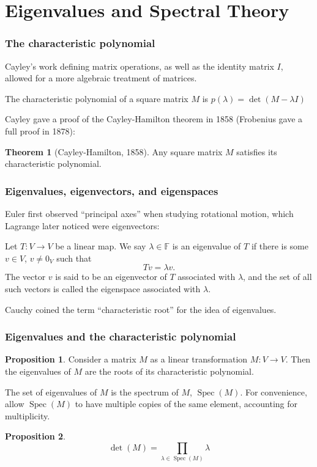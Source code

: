\documentclass{beamer}
\DeclareMathOperator{\Spec}{Spec}
\theoremstyle{definition}
\newtheorem*{theorem*}{Theorem}
\newtheorem*{proposition*}{Proposition}
\begin{document}
\section{Eigenvalues and Spectral Theory}

\begin{frame}
    \frametitle{The characteristic polynomial}

    Cayley's work defining matrix operations, as well as the identity matrix $I$, allowed for a more algebraic treatment of matrices.

    \pause
    \begin{definition}
        The characteristic polynomial of a square matrix $M$ is $p(\lambda) = \det(M - \lambda I)$
    \end{definition}

    \pause
    Cayley gave a proof of the Cayley-Hamilton theorem in 1858 (Frobenius gave a full proof in 1878):
    \begin{theorem*}[Cayley-Hamilton, 1858]
        Any square matrix $M$ satisfies its characteristic polynomial.
    \end{theorem*}
\end{frame}

\begin{frame}
    \frametitle{Eigenvalues, eigenvectors, and eigenspaces}

    Euler first observed ``principal axes'' when studying rotational motion, which Lagrange later noticed were eigenvectors:
    \pause
    \begin{definition}
        Let $T: V \longrightarrow V$ be a linear map. We say $\lambda \in \mathbb{F}$ is an eigenvalue of $T$ if there is some $v \in V$, $v \neq 0_V$ such that
        \[
            Tv = \lambda v.
        \]
        The vector $v$ is said to be an eigenvector of $T$ associated with $\lambda$, and the set of all such vectors is called the eigenspace associated with $\lambda$.
    \end{definition}
    Cauchy coined the term ``characteristic root'' for the idea of eigenvalues.
\end{frame}

\begin{frame}
    \frametitle{Eigenvalues and the characteristic polynomial}
    \begin{proposition*}
        Consider a matrix $M$ as a linear transformation $M: V \longrightarrow V$. Then the eigenvalues of $M$ are the roots of its characteristic polynomial.
    \end{proposition*}
    \pause
    \begin{definition}
        The set of eigenvalues of $M$ is the spectrum of $M$, $\Spec(M)$. For convenience, allow $\Spec(M)$ to have multiple copies of the same element,
        accounting for multiplicity. 
    \end{definition}
    \pause
    \begin{proposition*}
        \[\det(M) = \prod_{\lambda \in \Spec(M)} \lambda\]
    \end{proposition*}
\end{frame}
\end{document}
